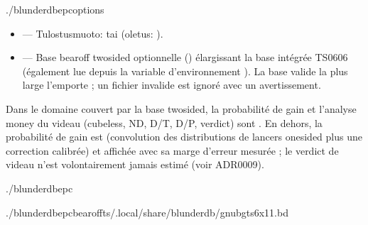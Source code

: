 \documentclass[letterpaper,10pt,finnish]{sphinxmanual}
\begin{document}
\begin{sphinxVerbatim}[commandchars=\\\{\}]
./blunderdbepc\PYG{o}{[}options\PYG{o}{]}
\end{sphinxVerbatim}

\sphinxAtStartPar
{}
\begin{itemize}
\item {} 
\sphinxAtStartPar
{} — Tulostusmuoto:  tai  (oletus: ).

\item {} 
\sphinxAtStartPar
{} — Base bearoff two\sphinxhyphen{}sided optionnelle () élargissant
la base intégrée TS\sphinxhyphen{}06\sphinxhyphen{}06 (également lue depuis la variable d’environnement
). La base valide la plus large l’emporte ; un fichier
invalide est ignoré avec un avertissement.

\end{itemize}

\sphinxAtStartPar
{} Dans le domaine couvert par la base two\sphinxhyphen{}sided, la probabilité de
gain et l’analyse money du videau (cubeless, ND, D/T, D/P, verdict) sont
. En dehors, la probabilité de gain est  (convolution
des distributions de lancers one\sphinxhyphen{}sided plus une correction calibrée) et
affichée avec sa marge d’erreur mesurée ; le verdict de videau n’est
volontairement jamais estimé (voir ADR\sphinxhyphen{}0009).

\sphinxAtStartPar
{}

\begin{sphinxVerbatim}[commandchars=\\\{\}]
./blunderdbepc

./blunderdbepc\PYGZhy{}\PYGZhy{}bearoff\PYGZhy{}ts\PYGZti{}/.local/share/blunderdb/gnubg\PYGZus{}ts6x11.bd
\end{sphinxVerbatim}
\end{document}
